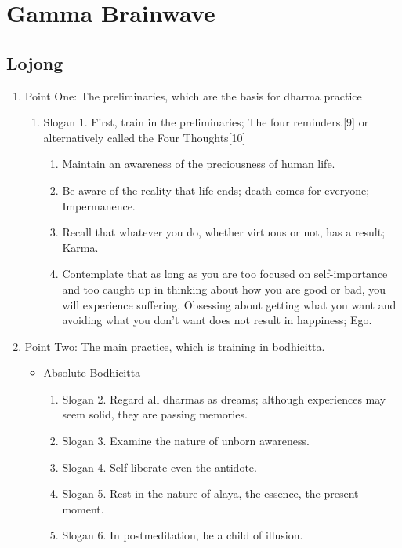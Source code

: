 \chapter{Gamma Brainwave}


\section{Lojong}
\begin{enumerate}%
  \item Point One: The preliminaries, which are the basis for dharma practice
    \begin{enumerate}

        \item Slogan 1. First, train in the preliminaries; The four reminders.[9] or alternatively called the Four Thoughts[10]
          \begin{enumerate}

            \item Maintain an awareness of the preciousness of human life.
            \item Be aware of the reality that life ends; death comes for everyone; Impermanence.
            \item Recall that whatever you do, whether virtuous or not, has a result; Karma.
            \item Contemplate that as long as you are too focused on self-importance and too caught up in thinking about how you are good or bad, you will experience suffering. Obsessing about getting what you want and avoiding what you don't want does not result in happiness; Ego.
      \end{enumerate}
    \end{enumerate}

    \item Point Two: The main practice, which is training in bodhicitta.
      \begin{itemize}
        \item Absolute Bodhicitta
          \begin{enumerate}
            \item Slogan 2. Regard all dharmas as dreams; although experiences may seem solid, they are passing memories.
            \item Slogan 3. Examine the nature of unborn awareness.
            \item Slogan 4. Self-liberate even the antidote.
            \item Slogan 5. Rest in the nature of alaya, the essence, the present moment.
            \item Slogan 6. In postmeditation, be a child of illusion.
          \end{enumerate}
      

\end{itemize}
\end{enumerate}
